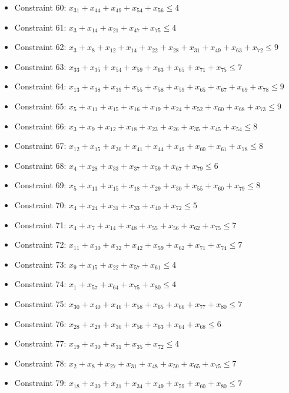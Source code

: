\documentclass[11pt]{article}
\begin{document}
\begin{itemize}
\item Constraint 60: $x_{31} + x_{44} + x_{49} + x_{54} + x_{56} \le 4$
\item Constraint 61: $x_{3} + x_{14} + x_{21} + x_{47} + x_{75} \le 4$
\item Constraint 62: $x_{3} + x_{8} + x_{12} + x_{14} + x_{22} + x_{28} + x_{31} + x_{49} + x_{63} + x_{72} \le 9$
\item Constraint 63: $x_{33} + x_{35} + x_{54} + x_{59} + x_{63} + x_{65} + x_{71} + x_{75} \le 7$
\item Constraint 64: $x_{13} + x_{38} + x_{39} + x_{55} + x_{58} + x_{59} + x_{65} + x_{67} + x_{69} + x_{78} \le 9$
\item Constraint 65: $x_{5} + x_{11} + x_{15} + x_{16} + x_{19} + x_{24} + x_{52} + x_{60} + x_{68} + x_{73} \le 9$
\item Constraint 66: $x_{3} + x_{9} + x_{12} + x_{18} + x_{23} + x_{26} + x_{35} + x_{45} + x_{54} \le 8$
\item Constraint 67: $x_{12} + x_{15} + x_{30} + x_{41} + x_{44} + x_{49} + x_{60} + x_{61} + x_{78} \le 8$
\item Constraint 68: $x_{4} + x_{28} + x_{33} + x_{37} + x_{59} + x_{67} + x_{79} \le 6$
\item Constraint 69: $x_{5} + x_{13} + x_{15} + x_{18} + x_{29} + x_{30} + x_{55} + x_{60} + x_{79} \le 8$
\item Constraint 70: $x_{4} + x_{24} + x_{31} + x_{33} + x_{40} + x_{72} \le 5$
\item Constraint 71: $x_{4} + x_{7} + x_{14} + x_{48} + x_{55} + x_{56} + x_{62} + x_{75} \le 7$
\item Constraint 72: $x_{11} + x_{30} + x_{32} + x_{42} + x_{59} + x_{62} + x_{71} + x_{74} \le 7$
\item Constraint 73: $x_{9} + x_{15} + x_{22} + x_{57} + x_{61} \le 4$
\item Constraint 74: $x_{1} + x_{57} + x_{64} + x_{75} + x_{80} \le 4$
\item Constraint 75: $x_{30} + x_{40} + x_{46} + x_{58} + x_{65} + x_{66} + x_{77} + x_{80} \le 7$
\item Constraint 76: $x_{28} + x_{29} + x_{30} + x_{56} + x_{63} + x_{64} + x_{68} \le 6$
\item Constraint 77: $x_{19} + x_{30} + x_{31} + x_{35} + x_{72} \le 4$
\item Constraint 78: $x_{2} + x_{8} + x_{27} + x_{31} + x_{48} + x_{50} + x_{65} + x_{75} \le 7$
\item Constraint 79: $x_{18} + x_{30} + x_{31} + x_{34} + x_{49} + x_{59} + x_{60} + x_{80} \le 7$

\end{itemize}
\end{document}
